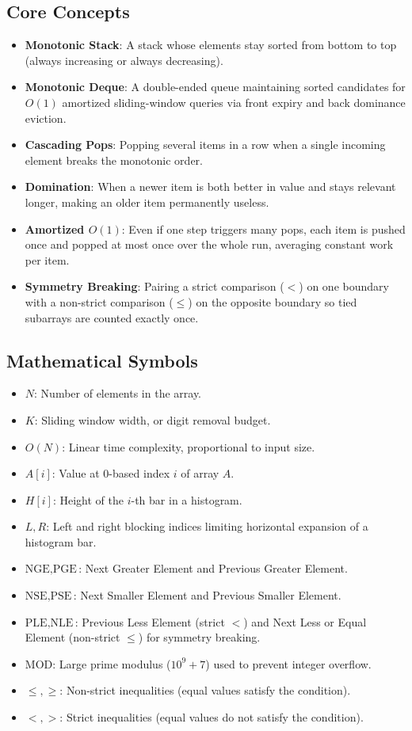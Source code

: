 \documentclass[11pt,a4paper]{article}
\theoremstyle{definition}
\begin{document}
\subsection{Core Concepts}
\begin{itemize}
    \item \textbf{Monotonic Stack}: A stack whose elements stay sorted from bottom to top (always increasing or always decreasing).
    \item \textbf{Monotonic Deque}: A double-ended queue maintaining sorted candidates for $O(1)$ amortized sliding-window queries via front expiry and back dominance eviction.
    \item \textbf{Cascading Pops}: Popping several items in a row when a single incoming element breaks the monotonic order.
    \item \textbf{Domination}: When a newer item is both better in value and stays relevant longer, making an older item permanently useless.
    \item \textbf{Amortized $O(1)$}: Even if one step triggers many pops, each item is pushed once and popped at most once over the whole run, averaging constant work per item.
    \item \textbf{Symmetry Breaking}: Pairing a strict comparison ($<$) on one boundary with a non-strict comparison ($\le$) on the opposite boundary so tied subarrays are counted exactly once.
\end{itemize}

\subsection{Mathematical Symbols}
\begin{itemize}
    \item $N$: Number of elements in the array.
    \item $K$: Sliding window width, or digit removal budget.
    \item $O(N)$: Linear time complexity, proportional to input size.
    \item $A[i]$: Value at $0$-based index $i$ of array $A$.
    \item $H[i]$: Height of the $i$-th bar in a histogram.
    \item $L, R$: Left and right blocking indices limiting horizontal expansion of a histogram bar.
    \item $\text{NGE}, \text{PGE}$: Next Greater Element and Previous Greater Element.
    \item $\text{NSE}, \text{PSE}$: Next Smaller Element and Previous Smaller Element.
    \item $\text{PLE}, \text{NLE}$: Previous Less Element (strict $<$) and Next Less or Equal Element (non-strict $\le$) for symmetry breaking.
    \item $\text{MOD}$: Large prime modulus ($10^9 + 7$) used to prevent integer overflow.
    \item $\le, \ge$: Non-strict inequalities (equal values satisfy the condition).
    \item $<, >$: Strict inequalities (equal values do not satisfy the condition).
\end{itemize}
\end{document}
